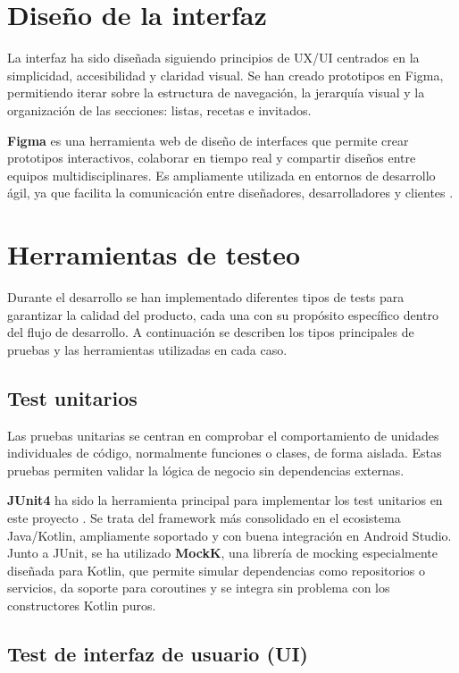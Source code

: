 \section{Diseño de la interfaz}

La interfaz ha sido diseñada siguiendo principios de UX/UI centrados en la simplicidad, accesibilidad y claridad visual. Se han creado prototipos en Figma, permitiendo iterar sobre la estructura de navegación, la jerarquía visual y la organización de las secciones: listas, recetas e invitados.

\textbf{Figma} es una herramienta web de diseño de interfaces que permite crear prototipos interactivos, colaborar en tiempo real y compartir diseños entre equipos multidisciplinares. Es ampliamente utilizada en entornos de desarrollo ágil, ya que facilita la comunicación entre diseñadores, desarrolladores y clientes \cite{figma}.

\section{Herramientas de testeo}

Durante el desarrollo se han implementado diferentes tipos de tests para garantizar la calidad del producto, cada una con su propósito específico dentro del flujo de desarrollo. A continuación se describen los tipos principales de pruebas y las herramientas utilizadas en cada caso.

\subsection{Test unitarios}

Las pruebas unitarias se centran en comprobar el comportamiento de unidades individuales de código, normalmente funciones o clases, de forma aislada. Estas pruebas permiten validar la lógica de negocio sin dependencias externas.

\textbf{JUnit4} ha sido la herramienta principal para implementar los test unitarios en este proyecto \cite{android-testing}. Se trata del framework más consolidado en el ecosistema Java/Kotlin, ampliamente soportado y con buena integración en Android Studio. Junto a JUnit, se ha utilizado \textbf{MockK}, una librería de mocking especialmente diseñada para Kotlin, que permite simular dependencias como repositorios o servicios, da soporte para coroutines y se integra sin problema con los constructores Kotlin puros.

\subsection{Test de interfaz de usuario (UI)}

